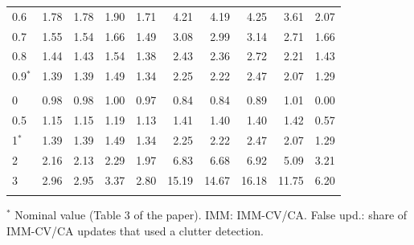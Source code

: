 \begin{table}[!htbp]
\begin{tabular}{@{}lrrrrrrrrr@{}}
0.6 & 1.78 & 1.78 & 1.90 & 1.71 & 4.21 & 4.19 & 4.25 & 3.61 & 2.07 \\
0.7 & 1.55 & 1.54 & 1.66 & 1.49 & 3.08 & 2.99 & 3.14 & 2.71 & 1.66 \\
0.8 & 1.44 & 1.43 & 1.54 & 1.38 & 2.43 & 2.36 & 2.72 & 2.21 & 1.43 \\
0.9$^\ast$ & 1.39 & 1.39 & 1.49 & 1.34 & 2.25 & 2.22 & 2.47 & 2.07 & 1.29 \\
\addlinespace[2pt]
\multicolumn{11}{@{}l}{\textit{False alarms per scan}} \\
0 & 0.98 & 0.98 & 1.00 & 0.97 & 0.84 & 0.84 & 0.89 & 1.01 & 0.00 \\
0.5 & 1.15 & 1.15 & 1.19 & 1.13 & 1.41 & 1.40 & 1.40 & 1.42 & 0.57 \\
1$^\ast$ & 1.39 & 1.39 & 1.49 & 1.34 & 2.25 & 2.22 & 2.47 & 2.07 & 1.29 \\
2 & 2.16 & 2.13 & 2.29 & 1.97 & 6.83 & 6.68 & 6.92 & 5.09 & 3.21 \\
3 & 2.96 & 2.95 & 3.37 & 2.80 & 15.19 & 14.67 & 16.18 & 11.75 & 6.20 \\
\addlinespace[2pt]
\bottomrule
\end{tabular}

\smallskip
\parbox{\textwidth}{\footnotesize $^\ast$ Nominal value (Table 3 of the paper). IMM: IMM-CV/CA. False upd.: share of IMM-CV/CA updates that used a clutter detection.}
\end{table}
